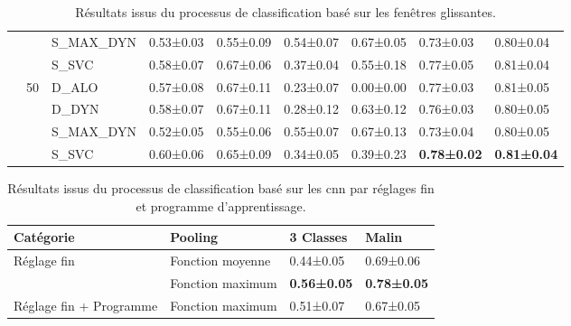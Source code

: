 \begin{landscape}
\begin{table}[H]
\begin{tabular}{cclllllll}
							        &                                   & S\_MAX\_DYN               & 0.53±0.03         & 0.55±0.09     & 0.54±0.07         & 0.67±0.05     & 0.73±0.03         & 0.80±0.04         \\
							        &                                   & S\_SVC                    & 0.58±0.07         & 0.67±0.06     & 0.37±0.04         & 0.55±0.18     & 0.77±0.05         & 0.81±0.04         \\ \cline{2-9}
							        & \multirow{4}{*}{50}               & D\_ALO                    & 0.57±0.08         & 0.67±0.11     & 0.23±0.07         & 0.00±0.00     & 0.77±0.03         & 0.81±0.05         \\
							        &                                   & D\_DYN                    & 0.58±0.07         & 0.67±0.11     & 0.28±0.12         & 0.63±0.12     & 0.76±0.03         & 0.80±0.05         \\
							        &                                   & S\_MAX\_DYN               & 0.52±0.05         & 0.55±0.06     & 0.55±0.07         & 0.67±0.13     & 0.73±0.04         & 0.80±0.05         \\
		                            &                                   & S\_SVC                    & 0.60±0.06         & 0.65±0.09     & 0.34±0.05         & 0.39±0.23     & \textbf{0.78±0.02}& \textbf{0.81±0.04}\\
		\bottomrule
    \end{tabular}
    \label{tab:image_improvement_sliding_window}
    \caption{Résultats issus du processus de classification basé sur les fenêtres glissantes.}
\end{table}

\end{landscape}

\begin{table}[H]
    \centering
    \begin{tabular}{llll}
        \toprule
        Catégorie                   & Pooling           & 3 Classes         & Malin             \\ \midrule
        \multirow{2}{*}{Réglage fin}& Fonction moyenne  & 0.44±0.05         & 0.69±0.06         \\
                                    & Fonction maximum  & \textbf{0.56±0.05}& \textbf{0.78±0.05}\\
        Réglage fin + Programme     & Fonction maximum  & 0.51±0.07         & 0.67±0.05         \\
        \bottomrule
    \end{tabular}
    
    \label{tab:image_improvement_fine}
    \caption{Résultats issus du processus de classification basé sur les \gls{cnn} par réglages fin et programme d'apprentissage.}
\end{table}